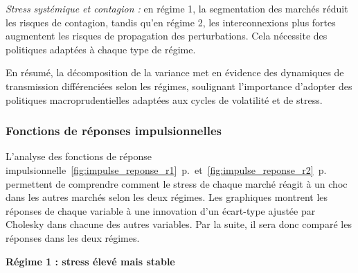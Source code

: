 \textit{Stress systémique et contagion :} en régime 1, la segmentation des marchés réduit les risques de contagion, tandis qu’en régime 2, les interconnexions plus fortes augmentent les risques de propagation des perturbations. Cela nécessite des politiques adaptées à chaque type de régime.

\vspace{0.5cm}

En résumé, la décomposition de la variance met en évidence des dynamiques de transmission différenciées selon les régimes, soulignant l’importance d’adopter des politiques macroprudentielles adaptées aux cycles de volatilité et de stress.

\subsubsection{Fonctions de réponses impulsionnelles}

L'analyse des fonctions de réponse impulsionnelle~\autoref{fig:impulse_reponse_r1}~p.\pageref{fig:impulse_reponse_r1}~et~\autoref{fig:impulse_reponse_r2}~p.\pageref{fig:impulse_reponse_r2} permettent de comprendre comment le stress de chaque marché réagit à un choc dans les autres marchés selon les deux régimes. Les graphiques montrent les réponses de chaque variable à une innovation d'un écart-type ajustée par Cholesky dans chacune des autres variables. Par la suite, il sera donc comparé les réponses dans les deux régimes.

\vspace{0.5cm}

\textbf{Régime 1 : stress élevé mais stable}


